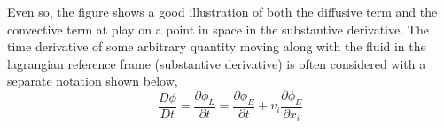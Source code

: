 Even so, the figure shows a good illustration of both the diffusive term and the convective term at play on a point in space in the substantive derivative.
The time derivative of some arbitrary quantity moving along with the fluid in the lagrangian reference frame (substantive derivative) is often considered with a separate notation shown below,
\begin{equation}\frac{D \phi}{Dt} = \frac{\partial \phi_{L}}{\partial t} = \frac{\partial \phi_{E}}{\partial t} + v_{i}\frac{\partial \phi_{E}}{\partial x_{i}} \label{Substantive Derivative Extra Notation}\end{equation}


